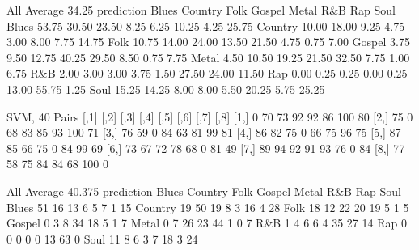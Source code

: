 \documentclass[a4paper,oneside]{article}
\begin{document}
All
Average 34.25
prediction Blues Country  Folk Gospel Metal   R\&B   Rap  Soul
   Blues   53.75   30.50 23.50   8.25  6.25 10.25  4.25 25.75
   Country 10.00   18.00  9.25   4.75  3.00  8.00  7.75 14.75
   Folk    10.75   14.00 24.00  13.50 21.50  4.75  0.75  7.00
   Gospel   3.75    9.50 12.75  40.25 29.50  8.50  0.75  7.75
   Metal    4.50   10.50 19.25  21.50 32.50  7.75  1.00  6.75
   R\&B      2.00    3.00  3.00   3.75  1.50 27.50 24.00 11.50
   Rap      0.00    0.25  0.25   0.00  0.25 13.00 55.75  1.25
   Soul    15.25   14.25  8.00   8.00  5.50 20.25  5.75 25.25

SVM, 40
Pairs
     [,1] [,2] [,3] [,4] [,5] [,6] [,7] [,8]
[1,]    0   70   73   92   92   86  100   80
[2,]   75    0   68   83   85   93  100   71
[3,]   76   59    0   84   63   81   99   81
[4,]   86   82   75    0   66   75   96   75
[5,]   87   85   66   75    0   84   99   69
[6,]   73   67   72   78   68    0   81   49
[7,]   89   94   92   91   93   76    0   84
[8,]   77   58   75   84   84   68  100    0

All
Average 40.375
prediction Blues Country Folk Gospel Metal R\&B Rap Soul
   Blues      51      16   13      6     5   7   1   15
   Country    19      50   19      8     3  16   4   28
   Folk       18      12   22     20    19   5   1    5
   Gospel      0       3    8     34    18   5   1    7
   Metal       0       7   26     23    44   1   0    7
   R\&B         1       4    6      6     4  35  27   14
   Rap         0       0    0      0     0  13  63    0
   Soul       11       8    6      3     7  18   3   24
\end{document}
